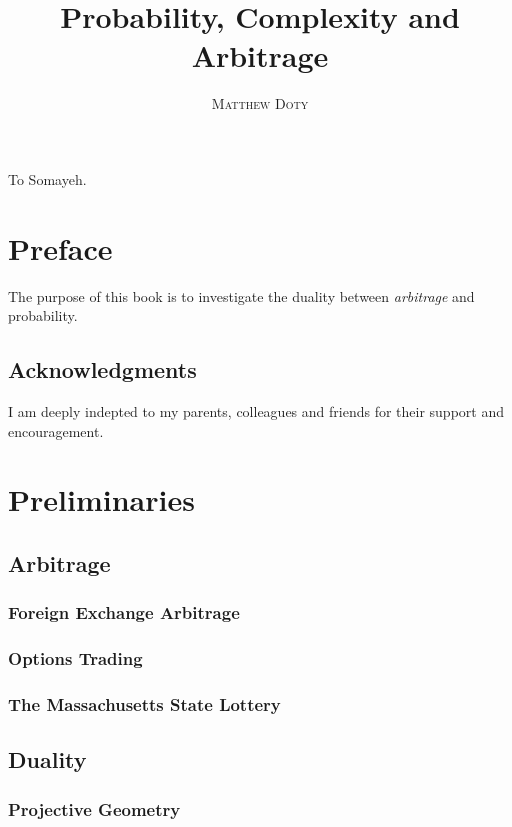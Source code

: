 \documentclass[a4paper,11pt]{book}
\title{\Huge \textbf{Probability, Complexity and Arbitrage}}
\author{\textsc{Matthew Doty}}
\date{}
\newenvironment{dedication}
{
   \cleardoublepage
   \thispagestyle{empty}
   \vspace*{\stretch{1}}
   \hfill\begin{minipage}[t]{0.66\textwidth}
   \raggedright
}
{
   \end{minipage}
   \vspace*{\stretch{3}}
   \clearpage
}
\begin{document}
\frontmatter
\maketitle

\begin{dedication}
To Somayeh.
\end{dedication}


\tableofcontents

\mainmatter

\chapter*{Preface}
The purpose of this book is to investigate the duality between \emph{arbitrage}
and probability.

\section*{Acknowledgments}
I am deeply indepted to my parents, colleagues and friends for their
  support and encouragement.

\chapter{Preliminaries}
\section{Arbitrage}
\subsection{Foreign Exchange Arbitrage}
\subsection{Options Trading}
\subsection{The Massachusetts State Lottery}
\section{Duality}
\subsection{Projective Geometry}
\end{document}

